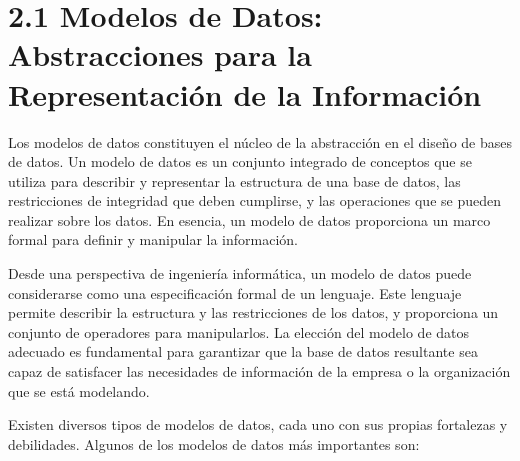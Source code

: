 \section{2.1 Modelos de Datos: Abstracciones para la Representación de la Información}

Los modelos de datos constituyen el núcleo de la abstracción en el diseño de bases de datos. Un modelo de datos es un conjunto integrado de conceptos que se utiliza para describir y representar la estructura de una base de datos, las restricciones de integridad que deben cumplirse, y las operaciones que se pueden realizar sobre los datos. En esencia, un modelo de datos proporciona un marco formal para definir y manipular la información.

Desde una perspectiva de ingeniería informática, un modelo de datos puede considerarse como una especificación formal de un lenguaje. Este lenguaje permite describir la estructura y las restricciones de los datos, y proporciona un conjunto de operadores para manipularlos. La elección del modelo de datos adecuado es fundamental para garantizar que la base de datos resultante sea capaz de satisfacer las necesidades de información de la empresa o la organización que se está modelando.

Existen diversos tipos de modelos de datos, cada uno con sus propias fortalezas y debilidades. Algunos de los modelos de datos más importantes son:

